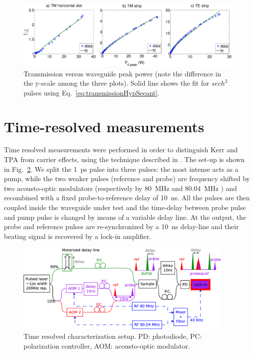 \documentclass[10pt,letterpaper]{article}
\begin{document}
\begin{figure}[htb]
    \centering
    \includegraphics[width=1.0\textwidth]{imGamma_slot_TM_TE_v6}
     \caption{Transmission versus waveguide peak power (note the difference in the y-scale among the three plots). Solid line shows the fit for $ sech^2 $ pulses using Eq.~\ref{eq:transmissionHypSecant}.}
    \label{fig:imGammaSamples}
\end{figure}



\section{Time-resolved measurements}
Time resolved measurements were performed in order to distinguish Kerr and TPA from carrier effects, using the technique described in \cite{Vallaitis2008}. The set-up is shown in Fig.~\ref{fig:setupTimeRes}. We split the 1~ps pulse into three pulses: the most intense acts as a pump, while the two weaker pulses (reference and probe) are frequency shifted by two acousto-optic modulators (respectively by 80~MHz and 80.04~MHz ) and recombined with a fixed probe-to-reference delay of 10~ns. All the pulses are then coupled inside the waveguide under test and the time-delay between probe pulse and pump pulse is changed by means of a variable delay line. At the output, the probe and reference pulses are re-synchronized by a 10~ns delay-line and their beating signal is recovered by a lock-in amplifier.

                                \begin{figure}[htb]
                                         \centering
                                         \includegraphics[width=0.95\textwidth]{timeResolved9}
                                         \caption{Time resolved characterization setup. PD: photodiode, PC: polarization controller, AOM: acousto-optic modulator.}
                                     \label{fig:setupTimeRes}
                                \end{figure}
\end{document}
